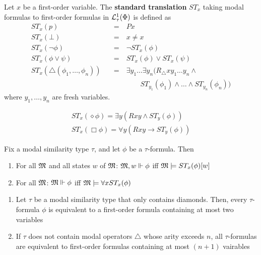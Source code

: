 \documentclass[11pt]{article}
\begin{document}
\begin{definition}
Let \(x\) be a first-order variable. The \textbf{standard translation} \(ST_x\) taking
modal formulas to first-order formulas in \(\mathcal{L}_\tau^1(\Phi)\) is defined as
\begin{align*}
ST_x(p)&\quad\text{=}\quad Px\\
ST_x(\bot)&\quad\text{=}\quad x\neq x\\
ST_x(\neg\phi)&\quad\text{=}\quad \neg ST_x(\phi)\\
ST_x(\phi\vee\psi)&\quad\text{=}\quad ST_x(\phi)\vee ST_x(\psi)\\
ST_x(\triangle(\phi_1,\dots,\phi_n))&\quad\text{=}\quad \exists y_1\dots
\exists y_n(R_{\triangle} xy_1\dots y_n\wedge\\
&\hspace{2cm}ST_{y_1}(\phi_1)\wedge\dots\wedge ST_{y_n}(\phi_n) )
\end{align*}
where \(y_1,\dots,y_n\) are fresh variables.
\end{definition}

\begin{gather*}
ST_x(\diamond\phi)=\exists y(Rxy\wedge ST_y(\phi))\\
ST_x(\Box\phi)=\forall y(Rxy\to ST_y(\phi))
\end{gather*}

\begin{proposition}
Fix a modal similarity type \(\tau\), and let \(\phi\) be a \(\tau\)-formula. Then
\begin{enumerate}
\item For all \(\mathfrak{M}\) and all states \(w\) of \(\mathfrak{M}\): \(\mathfrak{M},w\Vdash \phi\) iff
\(\mathfrak{M}\models ST_x(\phi)[w]\)
\item For all \(\mathfrak{M}\): \(\mathfrak{M}\Vdash\phi\) iff \(\mathfrak{M}\models\forall x ST_x(\phi)\)
\end{enumerate}
\end{proposition}

\begin{proposition}[]
\begin{enumerate}
\item Let \(\tau\) be a modal similarity type that only contains diamonds. Then, every
\(\tau\)-formula \(\phi\) is equivalent to a first-order formula containing at
most two variables
\item If \(\tau\) does not contain modal operators \(\triangle\) whose arity exceeds
\(n\), all \(\tau\)-formulas are equivalent to first-order formulas
containing at most \((n+1)\) vairables
\end{enumerate}
\end{proposition}
\end{document}
